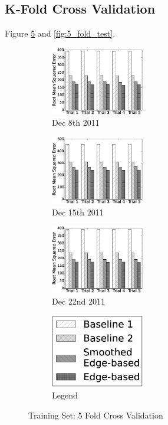 \documentclass{sig-alternate}
\begin{document}
\subsection{K-Fold Cross Validation}
Figure \ref{fig:5_fold_train} and \ref{fig:5_fold_test}.
\begin{figure}[htb]
	\centering
	\begin{subfigure}{1.6in}
		\includegraphics[width=1.6in]{20111208_train} %
		\caption{Dec 8th 2011}
		\label{fig:20111208_train}
	\end{subfigure}
	\begin{subfigure}{1.6in}
		\includegraphics[width=1.6in]{20111215_train} %
		\caption{Dec 15th 2011}
		\label{fig:20111215_train}
	\end{subfigure}
	\begin{subfigure}{1.6in}
		\includegraphics[width=1.6in]{20111222_train} %
		\caption{Dec 22nd 2011}
		\label{fig:20111222_train}
	\end{subfigure}
	\begin{subfigure}{1.6in}
		\includegraphics[width=1.6in]{legend} %
		\caption{Legend}
		\label{fig:legend_train}
	\end{subfigure}
	\caption{Training Set: 5 Fold Cross Validation}
	\label{fig:5_fold_train}
\end{figure}
\end{document}

